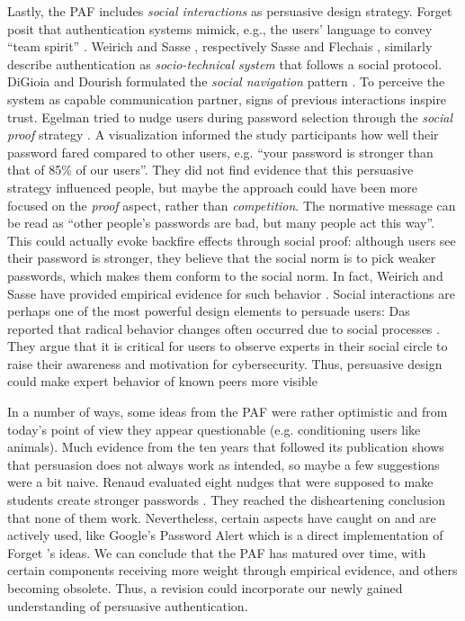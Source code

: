 	Lastly, the \gls{PAF} includes \textit{social interactions} as persuasive design strategy. Forget \etal posit that authentication systems mimick, e.g., the users' language to convey ``team spirit'' \cite{Forget2008PersuasionStrongerPasswords}. Weirich and Sasse \cite{Weirich2001PrettyGoodPersuasion}, respectively Sasse and Flechais \cite{Sasse2005UsableSecurityPosition}, similarly describe authentication as \textit{socio-technical system} that follows a social protocol. DiGioia and Dourish formulated the \textit{social navigation} pattern \cite{DiGioia2005SocialNavigationUsableSecurity}. To perceive the system as capable communication partner, signs of previous interactions inspire trust. Egelman \etal tried to nudge users during password selection through the \textit{social proof} strategy \cite{Egelman2013DoesMyPasswordGoUpToEleven}. A visualization informed the study participants how well their password fared compared to other users, e.g. ``your password is stronger than that of 85\% of our users''. They did not find evidence that this persuasive strategy influenced people, but maybe the approach could have been more focused on the \textit{proof} aspect, rather than \textit{competition}. The normative message can be read as ``other people's passwords are bad, but many people act this way''. This could actually evoke backfire effects through social proof: although users see their password is stronger, they believe that the social norm is to pick weaker passwords, which makes them conform to the social norm. In fact, Weirich and Sasse have provided empirical evidence for such behavior \cite{Weirich2001PrettyGoodPersuasion}. Social interactions are perhaps one of the most powerful design elements to persuade users: Das \etal reported that radical behavior changes often occurred due to social processes \cite{Das2014EffectSocialInfluenceSecuritySensitivity}. They argue that it is critical for users to observe experts in their social circle to raise their awareness and motivation for cybersecurity. Thus, persuasive design could make expert behavior of known peers more visible
	
	In a number of ways, some ideas from the \acrlong{PAF} were rather optimistic and from today's point of view they appear questionable (e.g. conditioning users like animals). Much evidence from the ten years that followed its publication shows that persuasion does not always work as intended, so maybe a few suggestions were a bit naive. Renaud \etal evaluated eight nudges that were supposed to make students create stronger passwords \cite{Renaud2017LessonsLearnedNudges}. They reached the disheartening conclusion that none of them work. Nevertheless, certain aspects have caught on and are actively used, like Google's Password Alert which is a direct implementation of Forget \etal's ideas. We can conclude that the \gls{PAF} has matured over time, with certain components receiving more weight through empirical evidence, and others becoming obsolete. Thus, a revision could incorporate our newly gained understanding of persuasive authentication.
	
